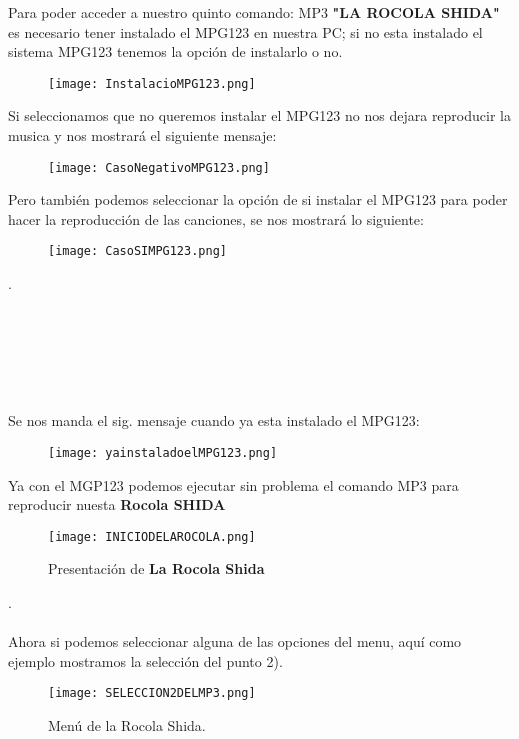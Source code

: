 \documentclass[titlepage]{article}
\begin{document}
Para poder acceder a nuestro quinto comando: MP3 \textbf{"LA ROCOLA SHIDA"} es necesario tener instalado el MPG123 en nuestra PC; si no esta instalado el sistema MPG123 tenemos la opción de instalarlo o no.
\begin{figure}[H]
    \centering
    \texttt{[image: InstalacioMPG123.png]}
    \end{figure}
    
Si seleccionamos que no queremos instalar el MPG123 no nos dejara reproducir la musica y nos mostrará el siguiente mensaje:
\begin{figure}[H]
    \centering
    \texttt{[image: CasoNegativoMPG123.png]}
    
\end{figure}

Pero también podemos seleccionar la opción de si instalar el MPG123 para poder hacer la reproducción de las canciones, se nos mostrará lo siguiente:
\begin{figure}[H]
    \centering
    \texttt{[image: CasoSIMPG123.png]}
   
\end{figure}
.\\\\\\\\\\\\\\

Se nos manda el sig. mensaje cuando ya esta instalado el MPG123:
\begin{figure}[H]
    \centering
    \texttt{[image: yainstaladoelMPG123.png]}
    
\end{figure}

Ya con el MGP123 podemos ejecutar sin problema el comando MP3 para reproducir nuesta \textbf{Rocola SHIDA}

\begin{figure}[H]
    \centering
    \texttt{[image: INICIODELAROCOLA.png]}
    \caption{Presentación de \textbf{La Rocola Shida}}
    
\end{figure}
.\\\\
Ahora si podemos seleccionar alguna de las opciones del menu, aquí como ejemplo mostramos la selección del punto 2).
\begin{figure}[H]
    \centering
    \texttt{[image: SELECCION2DELMP3.png]}
    \caption{Menú de la Rocola Shida.}
    \label{fig:ejemplo}
\end{figure}
\end{document}
